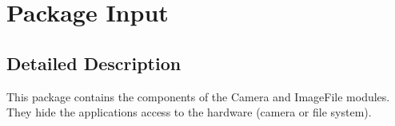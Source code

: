 \hypertarget{namespace_input}{}\section{Package Input}
\label{namespace_input}


\subsection{Detailed Description}
This package contains the components of the Camera and Image\+File modules. They hide the applications access to the hardware (camera or file system). 